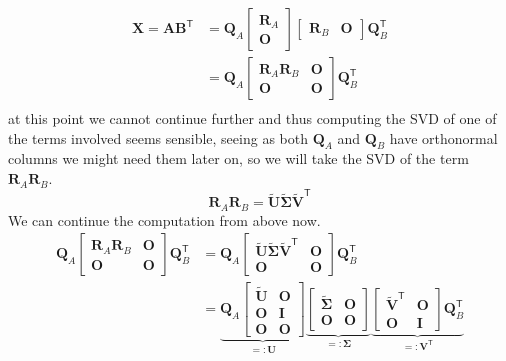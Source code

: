 \documentclass{article}
\newcommand\tr{\mathsf{T}}
\begin{document}
\begin{align*}
    \mathbf{X} = \mathbf{A}\mathbf{B}^{\mathsf{T}} &= \mathbf{Q}_{A}\begin{bmatrix}
    \mathbf{R}_{A}\\
    \mathbf{O}
    \end{bmatrix}
    \begin{bmatrix}
    \mathbf{R}_{B} & \mathbf{O}
    \end{bmatrix}\mathbf{Q}_{B}^{\mathsf{T}} \\
    &= \mathbf{Q}_{A}
    \begin{bmatrix}
        \mathbf{R}_{A}\mathbf{R}_{B} & \mathbf{O} \\
        \mathbf{O} & \mathbf{O}
    \end{bmatrix}
    \mathbf{Q}_{B}^{\tr} \\
\end{align*}
at this point we cannot continue further and thus computing the SVD of one of the terms involved seems sensible, seeing as both $\mathbf{Q}_{A}$ and $\mathbf{Q}_{B}$ have orthonormal columns we might need them later on, so we will take the SVD of the term $\mathbf{R}_{A}\mathbf{R}_{B}$. 
\begin{equation*}
  \mathbf{R}_{A}\mathbf{R}_{B} = \mathbf{\tilde{U}}\mathbf{\tilde{\Sigma}}\mathbf{\tilde{V}}^{\tr}  
\end{equation*}
We can continue the computation from above now.
\begin{align*}
    \mathbf{Q}_{A}
    \begin{bmatrix}
        \mathbf{R}_{A}\mathbf{R}_{B} & \mathbf{O} \\
        \mathbf{O} & \mathbf{O}
    \end{bmatrix}
    \mathbf{Q}_{B}^{\tr} &= \mathbf{Q}_{A}
    \begin{bmatrix}
        \mathbf{\tilde{U}}\mathbf{\tilde{\Sigma}}\mathbf{\tilde{V}}^{\tr}   & \mathbf{O} \\
        \mathbf{O} & \mathbf{O}
    \end{bmatrix}
    \mathbf{Q}_{B}^{\tr} \\
    &= \underbrace{\mathbf{Q}_{A} \begin{bmatrix}
        \mathbf{\tilde{U}} & \mathbf{O} \\
        \mathbf{O} & \mathbf{I} \\
        \mathbf{O} & \mathbf{O}
    \end{bmatrix}}_{=:\mathbf{U}}
    \underbrace{\begin{bmatrix}
        \mathbf{\tilde{\Sigma}} & \mathbf{O} \\
        \mathbf{O} & \mathbf{O}
    \end{bmatrix}}_{=:\mathbf{\Sigma}}
    \underbrace{\begin{bmatrix}
        \mathbf{\tilde{V}}^{\tr} & \mathbf{O} \\
        \mathbf{O} & \mathbf{I}
    \end{bmatrix}\mathbf{Q}_{B}^{\tr}}_{=:\mathbf{V}^{\tr}}
\end{align*}
\end{document}
